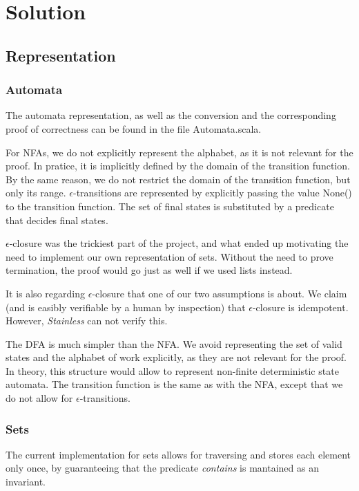 \documentclass[12pt, a4paper]{article}
\theoremstyle{break}
\begin{document}
\section{Solution}

\subsection{Representation}

\subsubsection{Automata}

The automata representation, as well as the conversion and the corresponding
proof of correctness can be found in the file Automata.scala.

For NFAs, we do not explicitly represent the alphabet, as it is not relevant for
the proof. In pratice, it is implicitly defined by the domain of the transition
function. By the same reason, we do not restrict the domain of the transition
function, but only its range. $\epsilon$-transitions are represented by
explicitly passing the value None() to the transition function. The set of final
states is substituted by a predicate that decides final states.

$\epsilon$-closure was the trickiest part of the project, and what ended up
motivating the need to implement our own representation of sets. Without the
need to prove termination, the proof would go just as well if we used lists
instead.

It is also regarding $\epsilon$-closure that one of our two assumptions
is about. We claim (and is easibly verifiable by a human by inspection) that
$\epsilon$-closure is idempotent. However, \textit{Stainless} can not verify this.

The DFA is much simpler than the NFA. We avoid representing the set of valid
states and the alphabet of work explicitly, as they are not relevant for the
proof. In theory, this structure would allow to represent non-finite
deterministic state automata. The transition function is the same as with the
NFA, except that we do not allow for $\epsilon$-transitions.


\subsubsection{Sets}

The current implementation for sets allows for traversing and stores each
element only once, by guaranteeing that the predicate \textit{contains} is
mantained as an invariant.
\end{document}
